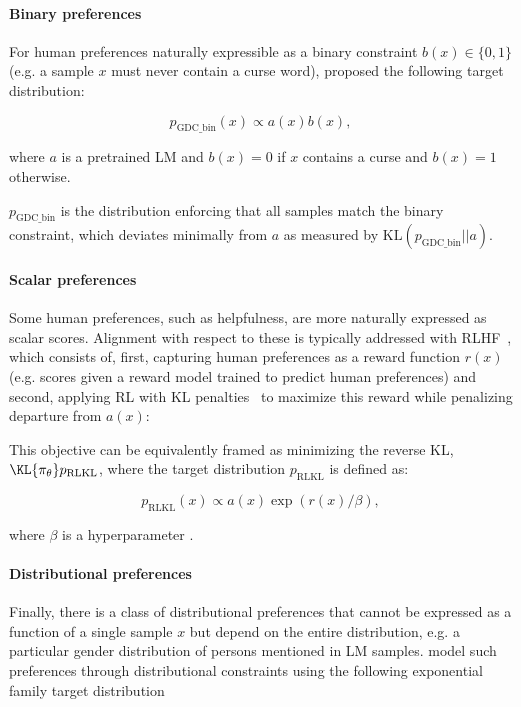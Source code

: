 \paragraph{Binary preferences} For human preferences naturally expressible as a binary constraint $b(x) \in \{0,1\}$ (e.g. a sample $x$ must never contain a curse word), \citet{khalifa2021distributional} proposed the following target distribution:

\begin{equation}
    p_\mathrm{GDC\_bin}(x) \propto a(x)b(x), \label{eq:p_binary}
\end{equation}

where $a$ is a pretrained LM and $b(x) = {0}$ if $x$ contains a curse and $b(x) = {1}$ otherwise. 

{$p_\mathrm{GDC\_bin}$ is the distribution enforcing that all samples match the binary constraint, which deviates minimally from $a$ as measured by $\mathrm{KL}(p_\mathrm{GDC\_bin}||a)$}.

\paragraph{Scalar preferences}\label{eq:rlhf}
Some human preferences, such as helpfulness, are more naturally expressed as scalar scores. Alignment with respect to these is typically addressed {with} RLHF~\citep{stiennon2020,ziegler2019fine,ouyang2022training}, which consists of, first, capturing human preferences as a reward function {$r(x)$} (e.g. scores given a reward model trained to predict human preferences) and second, {applying \textrm{RL with KL penalties}~\citep{todorov,kappen2012optimal,KL_Jaques17,KL_jaquesK19} to maximize this reward } while penalizing departure from $a(x)$:

This objective can be equivalently framed as {minimizing the reverse KL, {$\KL {\pi_\theta} p_\mathrm{RLKL}$, where the target distribution $p_\mathrm{RLKL}$ is defined as}}:

\begin{equation}
p_\mathrm{RLKL}(x)  \propto a(x)\exp({r}(x)/\beta),\label{eq:p_RLKL}
\end{equation}

where $\beta$ is a hyperparameter \citep{korbak2022reinforcement}. 

\paragraph{Distributional preferences} Finally, there is a class of distributional {preferences} \cite{ethical_lm_deepmind} that cannot be expressed as a function of a single sample $x$ but depend on the entire distribution, e.g. a particular gender distribution of persons mentioned in LM samples. \citet{khalifa2021distributional} {model such preferences} through distributional constraints using the following exponential family target distribution

